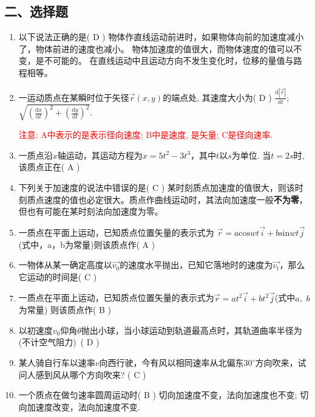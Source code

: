 \subsection*{二、选择题}
\begin{enumerate}
    \item 以下说法正确的是( D )
    {物体作直线运动前进时，如果物体向前的加速度减小了，物体前进的速度也减小。}
    {物体加速度的值很大，而物体速度的值可以不变，是不可能的。}
    {在直线运动中且运动方向不发生变化时，位移的量值与路程相等。}
    \item 一运动质点在某瞬时位于矢径$\vec{r}(x,y)$的端点处, 其速度大小为( D )
    {$\frac{\mathrm{d}|\vec{r}|}{\mathrm{d}t}$;}{$\sqrt{(\frac{\mathrm{d}x}{\mathrm{d}t})^2+(\frac{\mathrm{d}y}{\mathrm{d}t})^2}$.}


    \textcolor{red}{注意: A中表示的是表示径向速度; B中是速度, 是矢量; C是径向速率. }
    \item 一质点沿$x$轴运动，其运动方程为$x=5t^2-3t^3$，其中$t$以$s$为单位. 当$t=2s$时, 该质点正在( A )
    \item 下列关于加速度的说法中错误的是( C )
    {某时刻质点加速度的值很大，则该时刻质点速度的值也必定很大。}{质点作曲线运动时，其法向加速度一般\textbf{不为零}，但也有可能在某时刻法向加速度为零。}
    \item 一质点在平面上运动，已知质点位置矢量的表示式为 $\vec{r}=a\mathrm{cos}wt\vec{i}+b\mathrm{sin}wt\vec{j}$(式中，a，b为常量)则该质点作( A )
    \item 一物体从某一确定高度以$\vec{v_0}$的速度水平抛出，已知它落地时的速度为$\vec{v_t}$，那么它运动的时间是( C )
    \item 一质点在平面上运动，已知质点位置矢量的表示式为$\vec{r}=at^2\vec{i}+bt^2\vec{j}$(式中$a$,\ $b$为常量) 则该质点作( B )
    \item 以初速度$v_0$仰角$\theta$抛出小球，当小球运动到轨道最高点时，其轨道曲率半径为(不计空气阻力)\ ( D )
    \item 某人骑自行车以速率$v$向西行驶，今有风以相同速率从北偏东$30^\circ$方向吹来，试问人感到风从哪个方向吹来? ( C )
    \item 一个质点在做匀速率圆周运动时( B )
    {切向加速度不变，法向加速度也不变; }{切向加速度改变，法向加速度不变. }

\end{enumerate}

